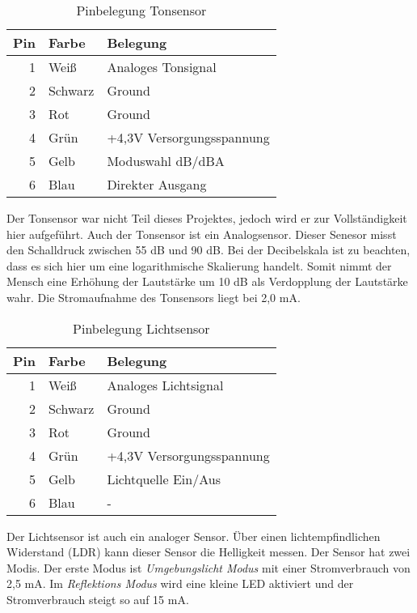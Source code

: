 \begin{table}[!ht]
\centering
\rmfamily
\caption{Pinbelegung Tonsensor}
\renewcommand{\arraystretch}{1.1}
\sffamily
\begin{footnotesize}
\begin{tabular}{r | l l}
\toprule
\textbf{Pin} & \textbf{Farbe}  & \textbf{Belegung}\\
\midrule
1 & Weiß & Analoges Tonsignal \\
2 & Schwarz & Ground \\
3 & Rot & Ground \\
4 & Grün & +4,3V Versorgungsspannung \\
5 & Gelb & Moduswahl dB/dBA \\
6 & Blau & Direkter Ausgang \\
\bottomrule
\end{tabular}
\end{footnotesize}
\label{tonsensor:tbl}
\end{table}
Der Tonsensor war nicht Teil dieses Projektes, jedoch wird er zur Vollständigkeit hier aufgeführt. Auch der Tonsensor ist ein Analogsensor. Dieser Senesor misst den Schalldruck zwischen 55 dB und 90 dB. Bei der Decibelskala ist zu beachten, dass es sich hier um eine logarithmische Skalierung handelt. Somit nimmt der Mensch eine Erhöhung der Lautstärke um 10 dB als Verdopplung der Lautstärke wahr. Die Stromaufnahme des Tonsensors liegt bei 2,0 mA.
\begin{table}[!ht]
\centering
\rmfamily
\caption{Pinbelegung Lichtsensor}
\renewcommand{\arraystretch}{1.1}
\sffamily
\begin{footnotesize}
\begin{tabular}{r | l l}
\toprule
\textbf{Pin} & \textbf{Farbe}  & \textbf{Belegung}\\
\midrule
1 & Weiß & Analoges Lichtsignal \\
2 & Schwarz & Ground \\
3 & Rot & Ground \\
4 & Grün & +4,3V Versorgungsspannung \\
5 & Gelb & Lichtquelle Ein/Aus \\
6 & Blau & - \\
\bottomrule
\end{tabular}
\end{footnotesize}
\label{lichtsensor:tbl}
\end{table}

Der Lichtsensor ist auch ein analoger Sensor. Über einen lichtempfindlichen Widerstand (LDR) kann dieser Sensor die Helligkeit messen. Der Sensor hat zwei Modis. Der erste Modus ist \emph{Umgebungslicht Modus} mit einer Stromverbrauch von 2,5 mA.  Im \emph{Reflektions Modus} wird eine kleine LED aktiviert und der Stromverbrauch steigt so auf 15 mA.

